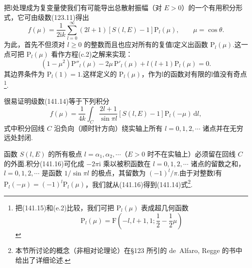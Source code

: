 把l处理成为复变量使我们有可能导出总散射振幅（对 $E>0$）的一个有用积分形式，它可由级数(123.11)得出
\begin{equation}
  f(\mu)=\frac{1}{2\mathrm{i}k}\sum_{l=0}^{\infty}(2l+1)
  \left[S(l,E)-1\right]\mathrm{P}_l(\mu),
  \qquad\mu=\cos\theta.
\end{equation}
为此，首先不但须对 $l\geqslant0$ 的整数而且也应对所有的复值l定义出函数 $\mathrm{P}_l(\mu)$.这一点可把 $\mathrm{P}_l(\mu)$ 看作方程(c.2)之解来实现：
\begin{equation}
  \left(1-\mu^2\right)\mathrm{P}''_l(\mu)
  -2\mu\,\mathrm{P}'_l(\mu)
  +l(l+1)\mathrm{P}_l(\mu)=0.
\end{equation}
其边界条件为 $\mathrm{P}_l(1)=1$.这样定义的 $\mathrm{P}_l(\mu)$，作为l的函数对有限的l值没有奇点\footnote{把(141.15)和(e.2)比较，我们可把 $\mathrm{P}_l(\mu)$ 表成超几何函数
\begin{equation*}
  \mathrm{P}_l(\mu)=\mathrm{F}\left(-l,l+1,1;\frac{1}{2}-\frac{1}{2}\mu\right)
\end{equation*}}.

很易证明级数(141.14)等于下列积分
\begin{equation}
  f(\mu)=\frac{1}{4k}\int_{C}
  \frac{2l+1}{\sin\pi l}
  \left[S(l,E)-1\right]\mathrm{P}_l(-\mu)\,\mathrm{d}l,
\end{equation}
式中积分回线 $C$ 沿负向（顺时针方向）绕实轴上所有 $l=0,1,2,\cdots$ 诸点并在无穷远处封闭.

函数 $S(l,E)$ 的所有极点 $l=\alpha_1,\alpha_2,\cdots$（$E>0$ 时不在实轴上）必须留在回线 $C$ 的外面.积分(141.16)可化成 $-2\pi\mathrm{i}$ 乘以被积函数在 $l=0,1,2,\cdots$ 诸点的留数之和，$l=0,1,2,\cdots$ 是函数 $1/\sin\pi l$ 的极点，其留数为 $(-1)^l/\pi$.由于对整数l有
$\mathrm{P}_l(-\mu)=(-1)^l\mathrm{P}_l(\mu)$，我们就从(141.16)得到(141.14)式\footnote{本节所讨论的概念（非相对论理论）在§123 所引的 de~Alfaro, Regge 的书中给出了详细论述.}.

